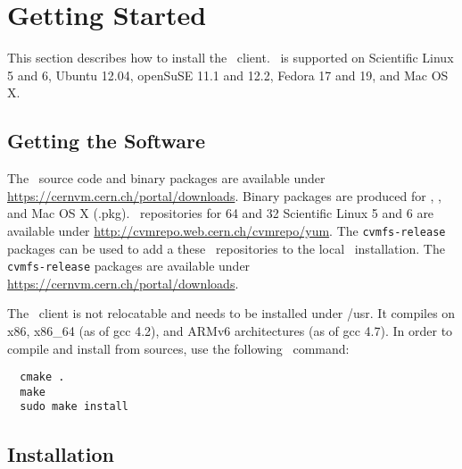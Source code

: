 \chapter{Getting Started}
\label{sct:start}

This section describes how to install the \cvmfs\ client.
\cvmfs\ is supported on Scientific Linux 5 and 6, Ubuntu 12.04, openSuSE 11.1 and 12.2, Fedora 17 and 19, and Mac OS X.

\section{Getting the Software}
The \cvmfs\ source code and binary packages are available under \url{https://cernvm.cern.ch/portal/downloads}.
Binary packages are produced for \rpm, \dpkg, and Mac OS X (.pkg).
\yum\ repositories for \SI{64}{\bit} and \SI{32}{\bit} Scientific Linux 5 and 6 are available under \url{http://cvmrepo.web.cern.ch/cvmrepo/yum}.
The \texttt{cvmfs-release} packages can be used to add a these \yum\ repositories to the local \yum\ installation.
The \texttt{cvmfs-release} packages are available under \url{https://cernvm.cern.ch/portal/downloads}.

The \cvmfs\ client is not relocatable and needs to be installed under /usr.
It compiles on x86, x86\_64 (as of gcc 4.2), and ARMv6 architectures (as of gcc 4.7).
In order to compile and install from sources, use the following \cmake\ command:
\begin{verbatim}
  cmake .
  make
  sudo make install
\end{verbatim}

\section{Installation}
